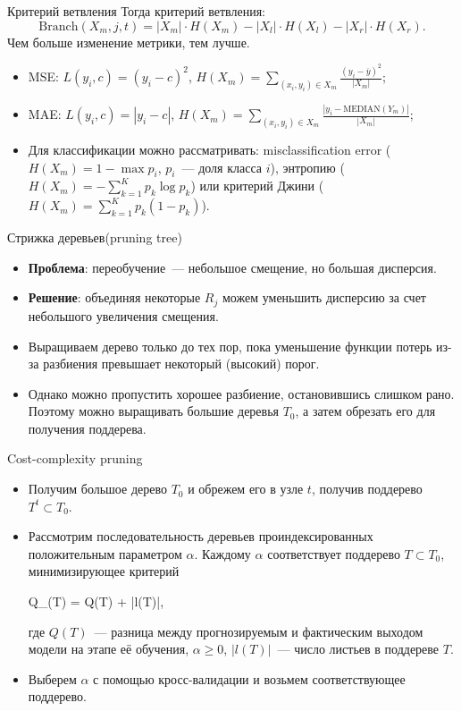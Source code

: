\documentclass[notheorems, handout]{beamer}
\begin{document}
\begin{frame}{Критерий ветвления}
	Тогда критерий ветвления:
	\[
	\mathrm{Branch} (X _m, j, t) = |X _m| \cdot H(X _m) - |X _l| \cdot H(X _l) - |X _r| \cdot H(X _r).
	\]
	Чем больше изменение метрики, тем лучше.

	\begin{itemize}
		\item MSE: $L (y _i, c) = (y _i - c) ^2$, $H (X _m) = \sum \limits _{(x _i, y _i) \in X _m} \frac {(y _i - \overline{y}) ^2} {|X _m|}$;
		\item MAE: $L (y _i, c) = |y _i - c|$, $H (X _m) = \sum \limits _{(x _i, y _i) \in X _m} \frac {|y _i - \mathrm{MEDIAN}(Y _m)|} {|X _m|}$;
		\item Для классификации можно рассматривать: misclassification error ($H (X _m) = 1 - \max p _i$, $p _i$~--- доля класса $i$), энтропию ($H (X _m) = - \sum ^K _{k = 1} p _k \log p_k$) или критерий Джини ($H (X _m) = \sum ^K _{k = 1} p _k (1 - p_k)$).
	\end{itemize}
\end{frame}

\begin{frame}{Стрижка деревьев(pruning tree)}
\begin{itemize}
	\item \textbf{Проблема}: переобучение~--- небольшое смещение, но большая дисперсия.\medskip
	\item \textbf{Решение}: объединяя некоторые $R_{j}$ можем уменьшить дисперсию за счет небольшого увеличения смещения.\medskip
	\item Выращиваем дерево только до тех пор, пока уменьшение функции потерь из-за разбиения превышает некоторый (высокий) порог.\medskip
	\item Однако можно пропустить хорошее разбиение, остановившись слишком рано. Поэтому можно выращивать большие деревья $T_{0}$, а затем обрезать его для получения поддерева.
\end{itemize}
\end{frame}

\begin{frame}{Cost-complexity pruning}
\begin{itemize}
	\item Получим большое дерево $T_{0}$ и обрежем его в узле $t$, получив поддерево $T^{t} \subset T_{0}$.\medskip
	\item Рассмотрим последовательность деревьев проиндексированных положительным параметром $\alpha$. Каждому $\alpha$ соответствует поддерево $T \subset T_{0}$, минимизирующее критерий
		\begin{flalign*}
			Q_{\alpha}(T) = Q(T) + \alpha |l(T)|,
		\end{flalign*}
где $Q(T)$~--- разница между прогнозируемым и фактическим выходом модели на этапе её обучения, $\alpha \geq 0$, $|l(T)|$~--- число листьев в поддереве $T$.\medskip
	\item Выберем $\alpha$ с помощью кросс-валидации и возьмем соответствующее поддерево.
\end{itemize}
\end{frame}
\end{document}
